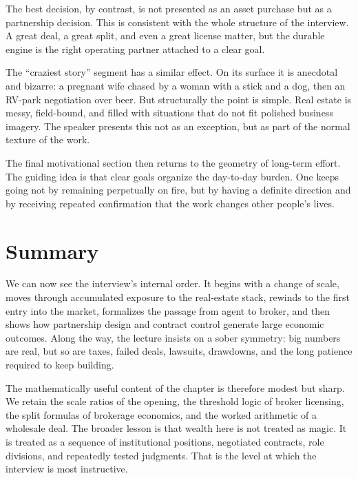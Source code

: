 The best decision, by contrast, is not presented as an asset purchase but as a partnership decision. This is consistent with the whole structure of the interview. A great deal, a great split, and even a great license matter, but the durable engine is the right operating partner attached to a clear goal.

The ``craziest story'' segment has a similar effect. On its surface it is anecdotal and bizarre: a pregnant wife chased by a woman with a stick and a dog, then an RV-park negotiation over beer. But structurally the point is simple. Real estate is messy, field-bound, and filled with situations that do not fit polished business imagery. The speaker presents this not as an exception, but as part of the normal texture of the work.

The final motivational section then returns to the geometry of long-term effort. The guiding idea is that clear goals organize the day-to-day burden. One keeps going not by remaining perpetually on fire, but by having a definite direction and by receiving repeated confirmation that the work changes other people's lives.

\section{Summary}

We can now see the interview's internal order. It begins with a change of scale, moves through accumulated exposure to the real-estate stack, rewinds to the first entry into the market, formalizes the passage from agent to broker, and then shows how partnership design and contract control generate large economic outcomes. Along the way, the lecture insists on a sober symmetry: big numbers are real, but so are taxes, failed deals, lawsuits, drawdowns, and the long patience required to keep building.

The mathematically useful content of the chapter is therefore modest but sharp. We retain the scale ratios of the opening, the threshold logic of broker licensing, the split formulas of brokerage economics, and the worked arithmetic of a wholesale deal. The broader lesson is that wealth here is not treated as magic. It is treated as a sequence of institutional positions, negotiated contracts, role divisions, and repeatedly tested judgments. That is the level at which the interview is most instructive.